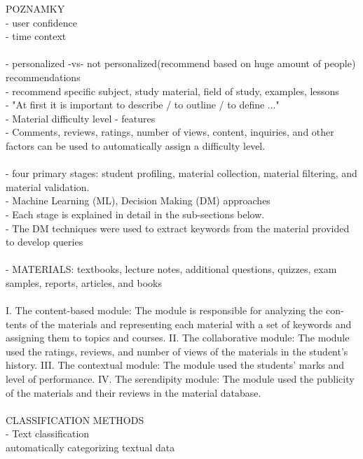 \documentclass[10pt,oneside,english,a4paper]{article}
\begin{document}
%
\clearpage{}
POZNAMKY\\
- user confidence\\
- time context\\\\
- personalized -vs- not personalized(recommend based on huge amount of people) recommendations\\
- recommend specific subject, study material, field of study, examples, lessons\\
- "At first it is important to describe / to outline / to define ..."\\
%
%
- Material difficulty level - features\\
- Comments, reviews, ratings, number of views, content, inquiries, and other factors can be used to automatically assign a difficulty level.\\\\
- four primary stages: student profiling, material collection, material filtering, and material validation. \\
- Machine Learning (ML), Decision Making (DM) approaches\\
- Each stage is explained in detail in the sub-sections below.\\
- The DM techniques were used to extract keywords from the material provided to develop queries\\\\
- MATERIALS: textbooks, lecture notes, additional questions, quizzes, exam samples, reports, articles, and books\\\\
%
I. The content-based module: The module is responsible for analyzing the con-
tents of the materials and representing each material with a set of keywords and
assigning them to topics and courses.
II. The collaborative module: The module used the ratings, reviews, and number of
views of the materials in the student’s history.
III. The contextual module: The module used the students’ marks and level of
performance.
IV. The serendipity module: The module used the publicity of the materials and their
reviews in the material database.
\cite{Zayet20237487}\\\\
%
CLASSIFICATION METHODS\\
- Text classification\\
automatically categorizing textual data


\end{document}
